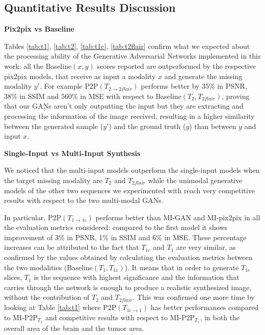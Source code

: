 \subsection{Quantitative Results Discussion}
\label{subsec:metrics_discussion}

\vspace{4mm} 
\noindent\textbf{Pix2pix vs Baseline}

\vspace{2mm}
\noindent Tables \ref{tab:t1}, \ref{tab:t2}, \ref{tab:t1c}, \ref{tab:t2flair} confirm what we expected about the processing ability of the Generative Adversarial Networks implemented in this work: all the Baseline$(x,y)$ scores reported are outperformed by the respective pix2pix models, that receive as input a modality $x$ and generate the missing modality $y'$. 
For example P2P$(T_{2 \rightarrow 2flair})$ performs better by 35\% in PSNR, 38\% in SSIM and 560\% in MSE with respect to Baseline$(T_{2}, T_{2flair})$, proving that our \ac{GAN}s aren't only outputting the input but they are extracting and processing the information of the image received, resulting in a higher similarity between the generated sample ($y'$) and the ground truth ($y$) than between $y$ and input $x$. 

\vspace{6mm} 
\noindent\textbf{Single-Input vs Multi-Input Synthesis}

\vspace{2mm}
\noindent We noticed that the multi-input models outperform the single-input models when the target missing modality are $T_{2}$ and $T_{2flair}$ while the unimodal generative models of the other two sequences we experimented with reach very competitive results with respect to the two multi-modal \ac{GAN}s. 

In particular, P2P$(T_{1 \rightarrow 1c})$ performs better than MI-GAN and MI-pix2pix in all the evaluation metrics considered: compared to the first model it shows improvement of 3\% in PSNR, 1\% in SSIM and 6\% in MSE.
These percentage increases can be attributed to the fact that $T_{1c}$ and $T_{1}$ are very similar, as confirmed by the values obtained by calculating the evaluation metrics between the two modalities (Baseline$(T_{1}, T_{1c})$). It means that in order to generate $T_{1c}$ slices, $T_{1}$ is the sequence with highest significance and the information that carries through the network is enough to produce a realistic synthesized image, without the contribution of $T_{2}$ and $T_{2flair}$.
This was confirmed one more time by looking at Table \ref{tab:t1} where P2P$(T_{1c \rightarrow 1})$ has better performances compared to MI-P2P{$_{T_{1}}$} and competitive results with respect to MI-P2P{$_{T_{1}}$}, in both the overall area of the brain and the tumor area. 

